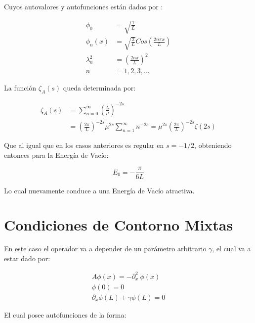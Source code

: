 Cuyos autovalores y autofunciones están dados por  : 

\begin{equation}
\begin{aligned}
	\phi _{0} &= \sqrt{\frac{1}{L}} \\[5pt]
	\phi _{n} (x) &= \sqrt{\frac{2}{L}} Cos( \frac{2 n \pi x}{L} ) \\[5pt]
	\lambda _n ^2 &= \left( \frac{2 n \pi }{L} \right) ^2 \\[5pt]
	n &= 1,2,3, ...
\end{aligned}
\end{equation}

La función $\zeta _A (s)$ queda determinada por:

\begin{equation}
\begin{aligned}
\zeta _A (s) &= 
\sum _{n=0} ^{\infty} \left( \frac{\lambda}{\mu} \right)^{-2s} \\[5pt]
&=  \left( \frac{2 \pi}{L} \right) ^{-2s} \mu ^{2s} \sum _{n=1} ^{\infty} n ^{-2s} =  
\mu ^{2s} \left( \frac{2 \pi}{L} \right) ^{-2s} \zeta (2s)
\end{aligned}
\end{equation}

Que al igual que en los casos anteriores es regular en $s=-1/2$, obteniendo entonces para la Energía de Vacío:

\begin{equation}
E _0 = - \frac{\pi}{6 L}
\end{equation}

Lo cual nuevamente conduce a una Energía de Vacío atractiva.

\section{Condiciones de Contorno Mixtas}

En este caso el operador va a depender de un parámetro arbitrario $\gamma$, el cual va a estar dado por:

\begin{equation}
\begin{array}{c}
    A \phi (x) = - \partial ^2 _x \ \phi (x)  \\[5pt]
    \phi (0) = 0 \\[5pt]
    \partial _x \phi (L) + \gamma \phi (L) = 0
\end{array}
\end{equation}

El cual posee autofunciones de la forma:

